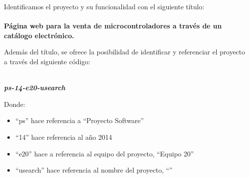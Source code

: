\noindent Identificamos el proyecto y su funcionalidad con el siguiente título:
\paragraph{}\textbf{\large \indent Página web para la venta de microcontroladores a través de un \newline \indent catálogo electrónico.}

\noindent \newline Además del título, se ofrece la posibilidad de identificar y referenciar el proyecto a través del siguiente código:
\begin{center}
        \textbf{\textit{\large \\ ps-14-e20-usearch}}
\end{center}
Donde:
        \begin{itemize}
        \renewcommand{\labelitemi}{$-$}
                \item ``ps'' hace referencia a ``Proyecto Software''
                \item ``14'' hace referencia al año 2014
                \item ``e20'' hace a referencia al equipo del proyecto, ``Equipo 20''
                \item ``usearch'' hace referencia al nombre del proyecto, ``\nombreDelProyecto''
        \end{itemize}